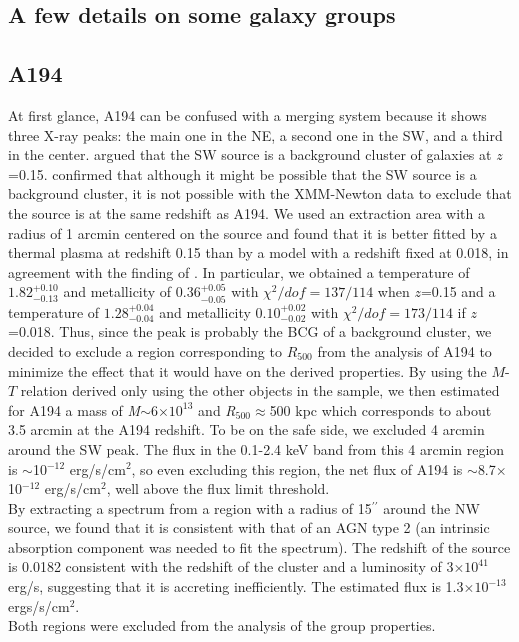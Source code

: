 \documentclass{aa} %
\begin{document}
\begin{appendix}
\section{A few details on some galaxy groups}
\subsection*{A194}
At first glance, A194 can be confused with a merging system because it
shows three X-ray peaks: the main one in the NE, a second one in the
SW, and a third in the center.  \cite{2005ApJ...622..187M} argued that
the SW source is a background cluster of galaxies at
$z$=0.15. \citet{2008MNRAS.384...87S} confirmed that although it might
be possible that the SW source is a background cluster, it is not
possible with the XMM-Newton data to exclude that the source
is at the same redshift as A194. We used an extraction area with a radius of 1 arcmin 
centered on the source and found that it is better
fitted by a thermal plasma at redshift 0.15 than by a model with a
redshift fixed at 0.018, in agreement with the finding of
\cite{2005ApJ...622..187M}. In particular, we obtained a temperature of
$1.82^{+0.10}_{-0.13}$ and metallicity of $0.36^{+0.05}_{-0.05}$ with
$\chi^2/dof=137/114$ when $z$=0.15 and a temperature of
$1.28^{+0.04}_{-0.04}$ and metallicity $0.10^{+0.02}_{-0.02}$ with
$\chi^2/dof=173/114$ if $z$=0.018. Thus, since the peak is probably
the BCG of a background cluster, we decided to exclude a region
corresponding to $R_{500}$ from the analysis of A194 to minimize the
effect that it would have on the derived properties. By using the
$M$-$T$ relation derived only using the other objects in the
sample, we then estimated for A194 a mass of {\it
  M}$\sim$6$\times10^{13}$ and {\it R$_{500}$}$\approx$500 kpc which
corresponds to about 3.5 arcmin at the A194 redshift. To be on the
safe side, we excluded 4 arcmin around the SW peak. The flux in the
0.1-2.4 keV band from this 4 arcmin region is $\sim$10$^{-12}$
erg/s/cm$^2$, so
even excluding this region, the net flux of A194 is $\sim$8.7$\times$10$^{-12}$
erg/s/cm$^2$, well above the flux limit threshold. \\
By extracting a spectrum from a region with a radius of
15$^{\prime\prime}$ around the NW source, we found that it is
consistent with that of an AGN type 2 (an intrinsic absorption
component was needed to fit the spectrum). The redshift of the source
is 0.0182 consistent with the redshift of the cluster and a luminosity of
3$\times10^{41}$ erg/s, suggesting that it is
accreting inefficiently. The estimated flux is 1.3$\times10^{-13}$ ergs/s/cm$^2$. \\
Both regions were excluded from the analysis of the group
properties.


\end{appendix}
\end{document}
